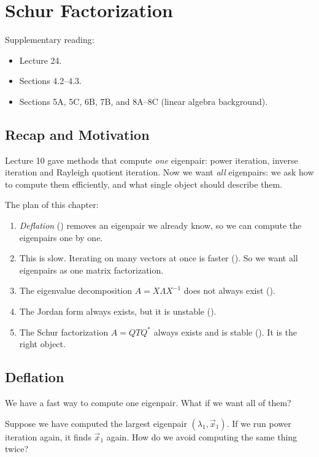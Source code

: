 \chapter{Schur Factorization}
\label{ch:schur}

Supplementary reading:
\begin{itemize}
  \item \cite{TB} Lecture 24.
  \item \cite{Demmel} Sections 4.2--4.3.
  \item \cite{Axler} Sections 5A, 5C, 6B, 7B, and 8A--8C (linear algebra background).
\end{itemize}

\section{Recap and Motivation}

Lecture 10 gave methods that compute \emph{one} eigenpair: power iteration, inverse iteration and Rayleigh quotient iteration. Now we want \emph{all} eigenpairs: we ask how to compute them efficiently, and what single object should describe them.

The plan of this chapter:
\begin{enumerate}
  \item \emph{Deflation} () removes an eigenpair we already know, so we can compute the eigenpairs one by one.
  \item This is slow. Iterating on many vectors at once is faster (). So we want all eigenpairs as one matrix factorization.
  \item The eigenvalue decomposition $A = X\Lambda X^{-1}$ does not always exist ().
  \item The Jordan form always exists, but it is unstable ().
  \item The Schur factorization $A = QTQ^\ast$ always exists and is stable (). It is the right object.
\end{enumerate}

\section{Deflation}
\label{sec:deflation}

We have a fast way to compute one eigenpair. What if we want all of them?

Suppose we have computed the largest eigenpair $(\lambda_1, \vec{x}_1)$. If we run power iteration again, it finds $\vec{x}_1$ again. How do we avoid computing the same thing twice?


